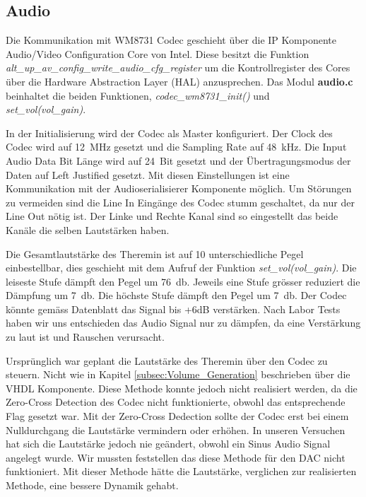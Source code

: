 \subsection{Audio}\label{subsec:audio}

Die Kommunikation mit WM8731 Codec geschieht über die IP Komponente Audio/Video Configuration Core von Intel. Diese besitzt die Funktion 
\textit{alt\_up\_av\_config\_write\_audio\_cfg\_register} um die Kontrollregister des Cores über die Hardware Abstraction Layer (HAL) anzusprechen\cite{Audio_config}.
Das Modul \textbf{audio.c} beinhaltet die beiden Funktionen, \textit{codec\_wm8731\_init()} und\\ \textit{set\_vol(vol\_gain)}. 

In der Initialisierung wird der Codec als Master konfiguriert. Der Clock des Codec wird auf \SI{12}{MHz} gesetzt und die Sampling Rate auf \SI{48}{kHz}. Die Input Audio Data Bit Länge wird auf \SI{24}{Bit} gesetzt und der Übertragungsmodus der Daten auf Left Justified gesetzt. Mit diesen Einstellungen ist eine Kommunikation mit der Audioserialisierer Komponente möglich.
Um Störungen zu vermeiden sind die Line In Eingänge des Codec stumm geschaltet, da nur der Line Out nötig ist. Der Linke und Rechte Kanal sind so eingestellt das beide Kanäle die selben Lautstärken haben\cite{codec}. 

Die Gesamtlautstärke des Theremin ist auf 10 unterschiedliche Pegel einbestellbar, dies geschieht mit dem Aufruf der Funktion \textit{set\_vol(vol\_gain)}. Die leiseste Stufe dämpft den Pegel um \SI{76}{db}. Jeweils eine Stufe grösser reduziert die Dämpfung um \SI{7}{db}. Die höchste Stufe dämpft den Pegel um \SI{7}{db}. Der Codec könnte gemäss Datenblatt das Signal bis +6dB verstärken. Nach Labor Tests haben wir uns entschieden das Audio Signal nur zu dämpfen, da eine Verstärkung zu laut ist und Rauschen verursacht.

Ursprünglich war geplant die Lautstärke des Theremin über den Codec zu steuern. Nicht wie in Kapitel \ref{subsec:Volume_Generation} beschrieben über die VHDL Komponente. Diese Methode konnte jedoch nicht realisiert werden, da die Zero-Cross Detection des Codec nicht funktionierte, obwohl das entsprechende Flag gesetzt war. Mit der Zero-Cross Dedection sollte der Codec erst bei einem Nulldurchgang die Lautstärke vermindern oder erhöhen. In unseren Versuchen hat sich die Lautstärke jedoch nie geändert, obwohl ein Sinus Audio Signal angelegt wurde. Wir mussten feststellen das diese Methode für den DAC nicht funktioniert. Mit dieser Methode hätte die Lautstärke, verglichen zur realisierten Methode, eine bessere Dynamik gehabt. 